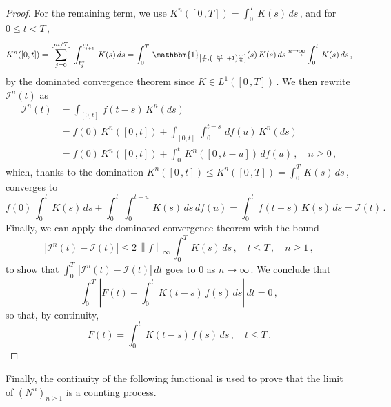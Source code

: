 \documentclass{article}
\newcommand{\1}{\mathbbm{1}}
\numberwithin{equation}{section}
\begin{document}
\begin{proof}
    For the remaining term, we use $K^n([0\,,T]) = \int_0^T\,K(s)\,ds\,$, and for $0 \leq t < T\,$,
    $$
    K^n([0,t]) = \sum_{j = 0}^{\lfloor nt / T\rfloor}\,\int_{t^n_j}^{t^n_{j+1}}\,K(s)\,ds = \int_0^T\, \1_{\left[\frac{T}{n},\left(\lfloor \frac{nt}{T}\rfloor + 1\right)\frac{T}{n}\right]}(s)\,K(s)\,ds \overset{n \to \infty}{\longrightarrow} \int_0^t\,K(s)\,ds\,,
    $$
    by the dominated convergence theorem since $K \in L^1([0\,,T])\,$. We then rewrite $\mathcal I^n(t)$ as
    \begin{align*}
    \mathcal I^n(t) &= \int_{[0,t]}\,f(t-s)\,K^n(ds) \\
    &= f(0)\,K^n([0\,,t]) + \int_{[0,t]}\,\int_0^{t-s}\,df(u)\,K^n(ds) \\
    &= f(0)\,K^n([0\,,t]) + \int_0^t\,K^n([0\,,t-u])\,df(u) \,, \quad n \geq 0\,,
    \end{align*}
    which, thanks to the domination $K^n([0\,,t]) \leq K^n([0\,,T]) = \int_0^T \,K(s)\,ds\,$, converges to 
    $$
    f(0)\,\int_0^t\,K(s)\,ds + \int_0^t\,\int_0^{t-u}\,K(s)\,ds\,df(u) = \int_0^t\,f(t-s)\,K(s)\,ds = \mathcal I(t)\,.
    $$
    Finally, we can apply the dominated convergence theorem with the bound 
    $$
    \left|\mathcal I^n(t) - \mathcal I(t)\right| \leq 2\,\left\|f\right\|_{\infty}\,\int_0^T\,K(s)\,ds\,, \quad t \leq T\,, \quad n \geq 1\,,
    $$
    to show that $\int_0^T\,\left|\mathcal I^n(t) - \mathcal I(t)\right|\,dt$ goes to $0$ as $n \to \infty\,$. We conclude that
    $$
    \int_0^T\,\left|F(t) - \int_0^t\,K(t-s)\,f(s)\,ds \right|\,dt = 0\,,
    $$
    so that, by continuity, 
    $$
    F(t) = \int_0^t \,K(t-s)\,f(s)\,ds\,, \quad t \leq T\,.
    $$
\end{proof}

Finally, the continuity of the following functional is used to prove that the limit of $(N^n)_{n \geq 1}$ is a counting process.
\end{document}
